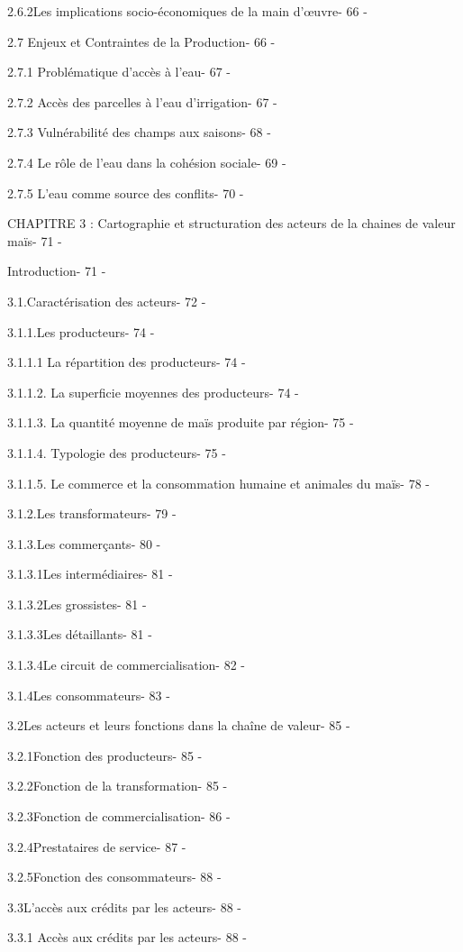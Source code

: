 \documentclass[12pt,oneside]{report}
\begin{document}
2.6.2Les implications socio-économiques de la main d’œuvre- 66 -

2.7 Enjeux et Contraintes de la Production- 66 -

2.7.1 Problématique d'accès à l'eau- 67 -

2.7.2 Accès des parcelles à l’eau d’irrigation- 67 -

2.7.3 Vulnérabilité des champs aux saisons- 68 -

2.7.4 Le rôle de l’eau dans la cohésion sociale- 69 -

2.7.5 L’eau comme source des conflits- 70 -

CHAPITRE 3 : Cartographie et structuration des acteurs de la chaines de valeur maïs- 71 -

Introduction- 71 -

3.1.Caractérisation des acteurs- 72 -

3.1.1.Les producteurs- 74 -

3.1.1.1 La répartition des producteurs- 74 -

3.1.1.2. La superficie moyennes des producteurs- 74 -

3.1.1.3. La quantité moyenne de maïs produite par région- 75 -

3.1.1.4. Typologie des producteurs- 75 -

3.1.1.5. Le commerce et la consommation humaine et animales du maïs- 78 -

3.1.2.Les transformateurs- 79 -

3.1.3.Les commerçants- 80 -

3.1.3.1Les intermédiaires- 81 -

3.1.3.2Les grossistes- 81 -

3.1.3.3Les détaillants- 81 -

3.1.3.4Le circuit de commercialisation- 82 -

3.1.4Les consommateurs- 83 -

3.2Les acteurs et leurs fonctions dans la chaîne de valeur- 85 -

3.2.1Fonction des producteurs- 85 -

3.2.2Fonction de la transformation- 85 -

3.2.3Fonction de commercialisation- 86 -

3.2.4Prestataires de service- 87 -

3.2.5Fonction des consommateurs- 88 -

3.3L’accès aux crédits par les acteurs- 88 -

3.3.1 Accès aux crédits par les acteurs- 88 -
\end{document}

